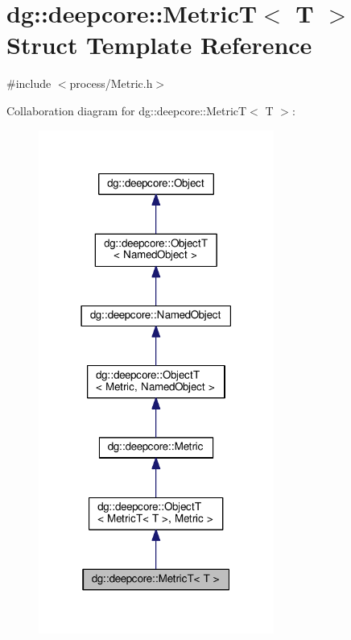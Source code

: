 \hypertarget{structdg_1_1deepcore_1_1_metric_t}{}\section{dg\+:\+:deepcore\+:\+:MetricT$<$ T $>$ Struct Template Reference}
\label{structdg_1_1deepcore_1_1_metric_t}


{\ttfamily \#include $<$process/\+Metric.\+h$>$}



Collaboration diagram for dg\+:\+:deepcore\+:\+:MetricT$<$ T $>$\+:
\nopagebreak
\begin{figure}[H]
\begin{center}
\leavevmode
\includegraphics[width=219pt]{structdg_1_1deepcore_1_1_metric_t__coll__graph}
\end{center}
\end{figure}
